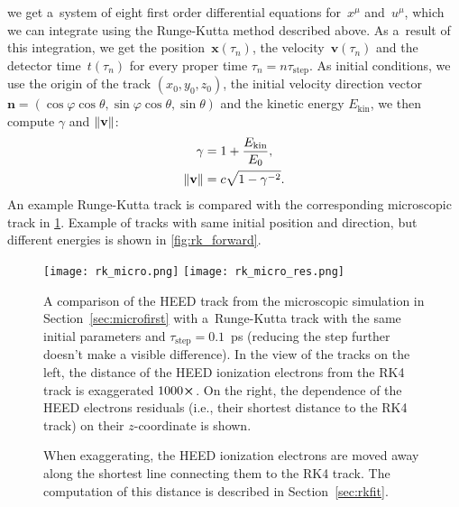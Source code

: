 		we get a~system of eight first order differential equations for~$x^\mu$ and~$u^\mu$, which we can integrate using the Runge-Kutta method described above. As a~result of this integration, we get the position~$\mathbf{x}(\tau_n)$, the velocity~$\mathbf{v}(\tau_n)$ and the detector time~$t(\tau_n)$ for every proper time $\tau_n = n \tau_\text{step}$. As initial conditions, we use the origin of the track $(x_0,y_0,z_0)$, the initial velocity direction vector $\mathbf{n} = (\cos\varphi\cos\theta,\sin\varphi\cos\theta,\sin\theta)$ and the kinetic energy $E_\text{kin}$, we then compute $\gamma$ and $\norm{\mathbf{v}}$:
			\begin{align}
				\gamma &= 1 + \frac{E_\text{kin}}{E_0},\\
				\norm{\mathbf{v}} &= c\sqrt{1-\gamma^{-2}}.
			\end{align}
		An example Runge-Kutta track is compared with the corresponding microscopic track in \cref{fig:rkmicro}. Example of tracks with same initial position and direction, but different energies is shown in \cref{fig:rk_forward}.
		
		\begin{figure}
			\centering
			\texttt{[image: rk\_micro.png]}
			\hfill
			\texttt{[image: rk\_micro\_res.png]}
			\caption{A comparison of the \ac{HEED} track from the microscopic simulation in Section~\ref{sec:microfirst} with a~Runge-Kutta track with the same initial parameters and $\tau_\text{step} = 0.1$~ps (reducing the step further doesn't make a visible difference). In the view of the tracks on the left, the distance of the \ac{HEED} ionization electrons from the \ac{RK4} track is exaggerated $1000\cross$. On the right, the dependence of the \ac{HEED} electrons residuals (i.e., their shortest distance to the \ac{RK4} track) on their $z$\protect\nobreakdash-coordinate is shown.}
			\caption*{\footnotesize{When exaggerating, the \ac{HEED} ionization electrons are moved away along the shortest line connecting them to the \ac{RK4} track. The computation of this distance is described in Section~\ref{sec:rkfit}.}}
			\label{fig:rkmicro}
		\end{figure}
		
